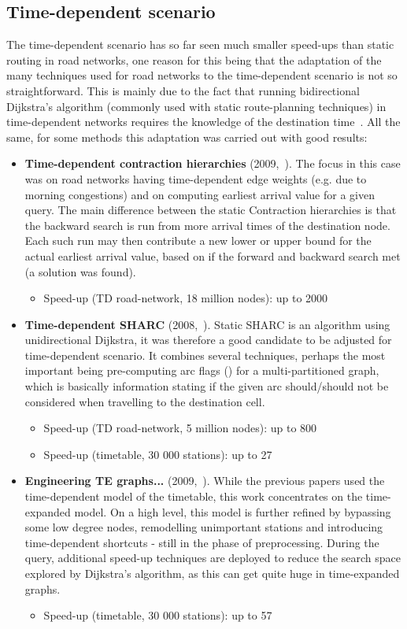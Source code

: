 \subsection{Time-dependent scenario}
	
	The time-dependent scenario has so far seen much smaller speed-ups than static routing in road networks, one reason for this being that the adaptation of the many techniques used for road networks to the time-dependent scenario is not so straightforward. This is mainly due to the fact that running bidirectional Dijkstra's algorithm (commonly used with static route-planning techniques) in time-dependent networks requires the knowledge of the destination time~\cite{engtimeexp09}. All the same, for some methods this adaptation was carried out with good results:
	\begin{itemize}
		\item \textbf{Time-dependent contraction hierarchies} (2009,~\cite{timedepch09}). The focus in this case was on road networks having time-dependent edge weights (e.g. due to morning congestions) and on computing earliest arrival value for a given query. The main difference between the static Contraction hierarchies is that the backward search is run from more arrival times of the destination node. Each such run may then contribute a new lower or upper bound for the actual earliest arrival value, based on if the forward and backward search met (a solution was found).
		\begin{itemize}
			\item Speed-up (TD road-network, 18 million nodes): up to 2000
		\end{itemize}
		\item \textbf{Time-dependent SHARC} (2008,~\cite{sharc08}). Static SHARC is an algorithm using unidirectional Dijkstra, it was therefore a good candidate to be adjusted for time-dependent scenario. It combines several techniques, perhaps the most important being pre-computing arc flags (\cite{arcflags06}) for a multi-partitioned graph, which is basically information stating if the given arc should/should not be considered when travelling to the destination cell.
		\begin{itemize}
			\item Speed-up (TD road-network, 5 million nodes): up to 800
			\item Speed-up (timetable, 30 000 stations): up to 27
		\end{itemize}
		\item \textbf{Engineering TE graphs...} (2009,~\cite{engtimeexp09}). While the previous papers used the time-dependent model of the timetable, this work concentrates on the time-expanded model. On a high level, this model is further refined by bypassing some low degree nodes, remodelling unimportant stations and introducing time-dependent shortcuts - still in the phase of preprocessing. During the query, additional speed-up techniques are deployed to reduce the search space explored by Dijkstra's algorithm, as this can get quite huge in time-expanded graphs.
		\begin{itemize}
			\item Speed-up (timetable, 30 000 stations): up to 57
		\end{itemize}
	\end{itemize}
